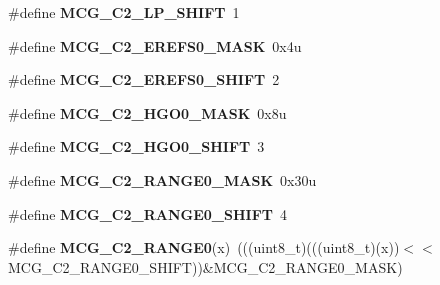 \begin{DoxyCompactItemize}
\mbox{\label{group___m_c_g___register___masks_ga2c16a5396267a83c2059741d31c3af1a}} 
\#define {\bfseries M\+C\+G\+\_\+\+C2\+\_\+\+L\+P\+\_\+\+S\+H\+I\+FT}~1
\item 
\mbox{\label{group___m_c_g___register___masks_gae9a32b79976c185a9b6567cc74b2d5af}} 
\#define {\bfseries M\+C\+G\+\_\+\+C2\+\_\+\+E\+R\+E\+F\+S0\+\_\+\+M\+A\+SK}~0x4u
\item 
\mbox{\label{group___m_c_g___register___masks_ga1cea960436deb685a7f131203e4898b5}} 
\#define {\bfseries M\+C\+G\+\_\+\+C2\+\_\+\+E\+R\+E\+F\+S0\+\_\+\+S\+H\+I\+FT}~2
\item 
\mbox{\label{group___m_c_g___register___masks_ga58de06b4d4514888ca2e7cbc68e50ccc}} 
\#define {\bfseries M\+C\+G\+\_\+\+C2\+\_\+\+H\+G\+O0\+\_\+\+M\+A\+SK}~0x8u
\item 
\mbox{\label{group___m_c_g___register___masks_ga881979b382aef0029c4e4990e365d8f5}} 
\#define {\bfseries M\+C\+G\+\_\+\+C2\+\_\+\+H\+G\+O0\+\_\+\+S\+H\+I\+FT}~3
\item 
\mbox{\label{group___m_c_g___register___masks_ga5436f4e93034d8536c23eabcac1b1a43}} 
\#define {\bfseries M\+C\+G\+\_\+\+C2\+\_\+\+R\+A\+N\+G\+E0\+\_\+\+M\+A\+SK}~0x30u
\item 
\mbox{\label{group___m_c_g___register___masks_gaca9dfaea66978e556c7a9773e2c8c531}} 
\#define {\bfseries M\+C\+G\+\_\+\+C2\+\_\+\+R\+A\+N\+G\+E0\+\_\+\+S\+H\+I\+FT}~4
\item 
\mbox{\label{group___m_c_g___register___masks_ga4717ad2318b6cbc4586d554b59d0382e}} 
\#define {\bfseries M\+C\+G\+\_\+\+C2\+\_\+\+R\+A\+N\+G\+E0}(x)~(((uint8\+\_\+t)(((uint8\+\_\+t)(x))$<$$<$M\+C\+G\+\_\+\+C2\+\_\+\+R\+A\+N\+G\+E0\+\_\+\+S\+H\+I\+FT))\&M\+C\+G\+\_\+\+C2\+\_\+\+R\+A\+N\+G\+E0\+\_\+\+M\+A\+SK)
\item 
\mbox{\label{group___m_c_g___register___masks_gae89f2e48b02a39563115d1a60dc8f16f}} 
$$
\end{DoxyCompactItemize}
